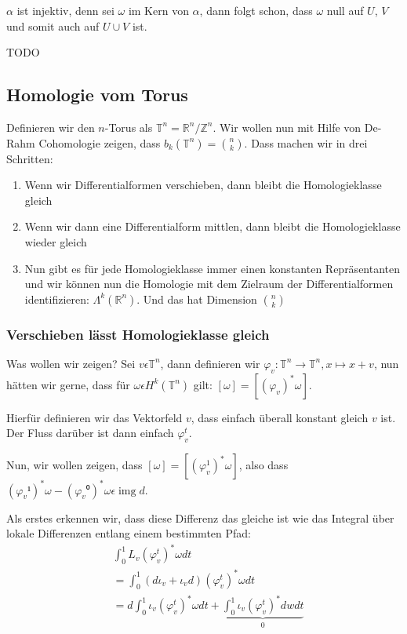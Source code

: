 \documentclass{article}
\DeclareMathOperator{\img}{img}
\begin{document}
	$α$ ist injektiv, denn sei $ω$ im Kern von $α$, dann folgt schon, dass $ω$ null auf $U$, $V$ und somit auch auf $U∪V$ ist.

	TODO

	\subsection{Homologie vom Torus}

	\newcommand{\torus}{\mathbb{T}^n}
	Definieren wir den $n$-Torus als $\torus = ℝ^n/ℤ^n$. Wir wollen nun mit Hilfe von De-Rahm Cohomologie zeigen, dass $b_k(\mathbb{T}^n) = \binom{n}{k}$. Dass machen wir in drei Schritten:
	\begin{enumerate}
		\item Wenn wir Differentialformen verschieben, dann bleibt die Homologieklasse gleich
		\item Wenn wir dann eine Differentialform mittlen, dann bleibt die Homologieklasse wieder gleich
		\item Nun gibt es für jede Homologieklasse immer einen konstanten Repräsentanten und wir können nun die Homologie mit dem Zielraum der Differentialformen identifizieren: $Λ^k(ℝ^n)$. Und das hat Dimension $\binom{n}{k}$
	\end{enumerate}

	\subsubsection{Verschieben lässt Homologieklasse gleich}

	Was wollen wir zeigen? Sei $v ϵ \torus$, dann definieren wir $φ_v: \torus → \torus, x ↦ x + v$, nun hätten wir gerne, dass für $ωϵH^k(\torus)$ gilt: $[ω] = [(φ_v)^* ω]$.

	\medskip

	Hierfür definieren wir das Vektorfeld $v$, dass einfach überall konstant gleich $v$ ist. Der Fluss darüber ist dann einfach $φ_v^t$.

	\medskip

	Nun, wir wollen zeigen, dass $[ω] = [(φ_v^1)^* ω]$, also dass $(φ_v¹)^* ω - (φ_v⁰)^* ω ϵ \img d$.

	\medskip

	Als erstes erkennen wir, dass diese Differenz das gleiche ist wie das Integral über lokale Differenzen entlang einem bestimmten Pfad:
	\begin{equation*}
		\begin{split}
			&\int_0^1 L_v (φ_v^t)^* ω dt \\
			&= \int_0^1 (dι_v + ι_vd) (φ_v^t)^* ω dt \\
			&= d \int_0^1 ι_v (φ_v^t)^* ω dt + \underbrace{\int_0^1 ι_v (φ_v^t)^* dw dt}_0
		\end{split}
	\end{equation*}
\end{document}
